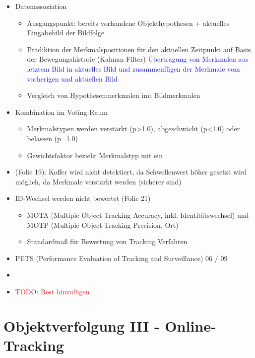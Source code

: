 \documentclass{report}
\newcommand{\com}[2][blue]{\textcolor{#1}{#2}}
\newcommand{\todo}[2][red]{\textcolor{#1}{TODO: #2}}
\begin{document}
\begin{itemize}
		\item Datenassoziation
		\begin{itemize}
			\item Ausgangspunkt: bereits vorhandene Objekthypothesen + aktuelles Eingabebild der Bildfolge
			\item Prädiktion der Merkmalspositionen für den aktuellen Zeitpunkt auf Basis der Bewegungshistorie (Kalman-Filter)
			\newline \com{Übertragung von Merkmalen aus letztem Bild in aktuelles Bild und zusammenfügen der Merkmale vom vorherigen und aktuellen Bild}
			\item Vergleich von Hypothesenmerkmalen imt Bildmerkmalen
		\end{itemize}
		
		\item Kombination im Voting-Raum
		\begin{itemize}
			\item Merkmalstypen werden verstärkt (p>1.0), abgeschwächt (p<1.0) oder belassen (p=1.0)
			\item Gewichtsfaktor bezieht Merkmalstyp mit ein
		\end{itemize}
		
		\item (Folie 19): Koffer wird nicht detektiert, da Schwellenwert höher gesetzt wird
		\newline möglich, da Merkmale verstärkt werden (sicherer sind)
		
		\item ID-Wechsel werden nicht bewertet (Folie 21)
		\begin{itemize}
			\item MOTA (Multiple Object Tracking Accuracy, inkl. Identitätswechsel) und MOTP (Multiple Object Tracking Precision, Ort)
			\item Standardmaß für Bewertung von Tracking Verfahren
		\end{itemize}
		
		\item PETS (Performance Evaluation of Tracking and Surveillance) 06 / 09
		\item 
		\item \todo{Rest hinzufügen}
	\end{itemize}
	\newpage
	
	\section{Objektverfolgung III - Online-Tracking}
	
\end{document}

